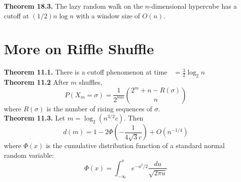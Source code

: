 \documentclass[12pt]{article}
\DeclareMathOperator*{\mix}{t_{\text{mix}}}
\begin{document}
\textbf{Theorem 18.3.} The lazy random walk on the $n$-dimensional hypercube has a cutoff at $(1/2)n\log n$ with a window size of $O(n)$.


\section{More on Riffle Shuffle}

\textbf{Theorem 11.1.} There is a cutoff phenomenon at time $\mix = \frac{3}{2} \log_2 n$\\

\textbf{Theorem 11.2} After $m$ shuffles, $$P(X_m = \sigma) = \frac{1}{2^{mn}} {2^m +n - R(\sigma) \choose n}$$ where $R(\sigma)$ is the number of rising sequences of $\sigma$.\\

\textbf{Theorem 11.3.} Let $m = \log_2(n^{3/2}c)$. Then $$d(m) = 1 - 2\Phi\left(-\frac{1}{4\sqrt{3}c}\right) + O(n^{-1/4})$$ where $\Phi(x)$ is the cumulative distribution function of a standard normal random variable: $$\Phi(x) = \int_{-\infty}^x e^{-u^2/2} \frac{du}{\sqrt{2 \pi u}}$$
\end{document}
